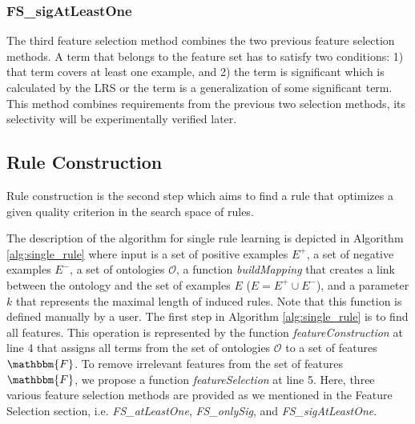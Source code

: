 \documentclass{bmcart}
\begin{document}
\subsubsection*{FS\_sigAtLeastOne}
The third feature selection method combines the two previous feature selection methods. A term that belongs to the feature set has to satisfy two conditions: 1) that term covers at least one example, and 2) the term is significant which is calculated by the LRS or the term is a generalization of some significant term. This method combines requirements from the previous two selection methods, its selectivity will be experimentally verified later.

\subsection*{Rule Construction}
Rule construction is the second step which aims to find a rule that optimizes a given quality criterion in the search space of rules.

The description of the algorithm for single rule learning is depicted in Algorithm \ref{alg:single_rule} where input is a set of positive examples $E^{+}$, a set of negative examples $E^{-}$, a set of ontologies $\mathcal{O}$, a function \emph{buildMapping} that creates a link between the ontology and the set of examples $E$ ($E = E^{+} \cup E^{-}$), and a parameter $k$ that represents the maximal length of induced rules. Note that this function is defined manually by a user. The first step in Algorithm \ref{alg:single_rule} is to find all features. This operation is represented by the function \emph{featureConstruction} at line 4 that assigns all terms from the set of ontologies $\mathcal{O}$ to a set of features $\mathbbm{F}$. To remove irrelevant features from the set of features $\mathbbm{F}$, we propose a function \textit{featureSelection} at line 5. Here, three various feature selection methods are provided as we mentioned in the Feature Selection section, i.e. \emph{FS\_atLeastOne}, \emph{FS\_onlySig}, and \emph{FS\_sigAtLeastOne}.
\end{document}
